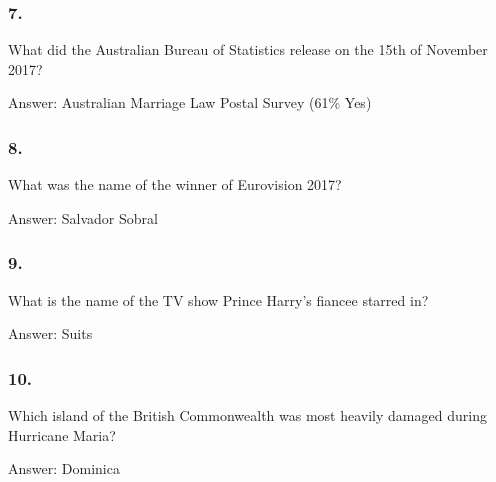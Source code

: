 \documentclass{beamer}
\begin{document}
    \begin{frame}
        \frametitle{7.}
        What did the Australian Bureau of Statistics release on the 15th of
        November 2017?\\

        \begin{center}
            Answer: Australian Marriage Law Postal Survey (61\% Yes)
        \end{center}
    \end{frame}

    \begin{frame}
        \frametitle{8.}
        What was the name of the winner of Eurovision 2017?\\

        \begin{center}
            Answer: Salvador Sobral
        \end{center}
    \end{frame}

    \begin{frame}
        \frametitle{9.}
        What is the name of the TV show Prince Harry's fiancee starred in?\\

        \begin{center}
            Answer: Suits
        \end{center}
    \end{frame}

    \begin{frame}
        \frametitle{10.}
        Which island of the British Commonwealth was most heavily damaged
        during Hurricane Maria?\\

        \begin{center}
            Answer: Dominica
        \end{center}
    \end{frame}
\end{document}
